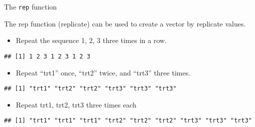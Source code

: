 \begin{frame}[fragile]{The \texttt{rep} function}
\protect\hypertarget{the-rep-function}{}

The rep function (replicate) can be used to create a vector by replicate
values.

\begin{itemize}
\tightlist
\item
  Repeat the sequence 1, 2, 3 three times in a row.
\end{itemize}

\begin{Shaded}
\begin{Highlighting}[]
    \NormalTok{(}\OperatorTok{:}\NormalTok{, } \NormalTok{)}
\end{Highlighting}
\end{Shaded}

\begin{verbatim}
## [1] 1 2 3 1 2 3 1 2 3
\end{verbatim}

\begin{itemize}
\tightlist
\item
  Repeat ``trt1'' once, ``trt2'' twice, and ``trt3'' three times.
\end{itemize}

\begin{Shaded}
\begin{Highlighting}[]
\NormalTok{(}\NormalTok{(}\NormalTok{, }\NormalTok{, }\NormalTok{), } \OperatorTok{:}\NormalTok{)}
\end{Highlighting}
\end{Shaded}

\begin{verbatim}
## [1] "trt1" "trt2" "trt2" "trt3" "trt3" "trt3"
\end{verbatim}

\begin{itemize}
\tightlist
\item
  Repeat trt1, trt2, trt3 three times each
\end{itemize}

\begin{Shaded}
\begin{Highlighting}[]
\NormalTok{(}\NormalTok{(}\NormalTok{, }\NormalTok{, }\NormalTok{),}\NormalTok{)}
\end{Highlighting}
\end{Shaded}

\begin{verbatim}
## [1] "trt1" "trt1" "trt1" "trt2" "trt2" "trt2" "trt3" "trt3" "trt3"
\end{verbatim}

\end{frame}

